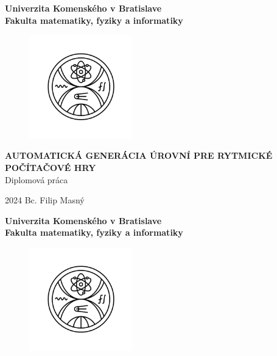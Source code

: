 \documentclass[12pt, oneside]{book}  %
\def\mfrok{2024}
\def\mftitle{Automatická Generácia Úrovní pre Rytmické Počítačové Hry}
\def\mfthesistype{Diplomová práca}
\def\mfauthor{Bc. Filip Masný}
\def\mfuniversity{Univerzita Komenského v Bratislave }
\def\mffaculty{Fakulta matematiky, fyziky a informatiky}
\begin{document}
\frontmatter


\thispagestyle{empty}

\noindent
\begin{minipage}{\textwidth}
    \begin{center}
        \textbf{\mfuniversity \\
            \mffaculty}
    \end{center}
\end{minipage}

\vfill
\begin{figure}[!hbt]
    \begin{center}
        \includegraphics[width=0.4\textwidth]{images/FMFI_logo_BP.png}\label{img:logo}
    \end{center}
\end{figure}
\begin{center}
    \textbf{\MakeUppercase{\Large\mftitle}}\\
    \mfthesistype
\end{center}
\vfill
\mfrok \hfill
\mfauthor
\cleardoublepage



\thispagestyle{empty}
\noindent
\begin{minipage}{\textwidth}
    \begin{center}
        \textbf{\mfuniversity \\
            \mffaculty}
    \end{center}
\end{minipage}

\vfill
\begin{figure}[!hbt]
    \begin{center}
        \includegraphics[width=0.4\textwidth]{images/FMFI_logo_BP.png}\label{img:logo_dark}
    \end{center}
\end{figure}
\end{document}
